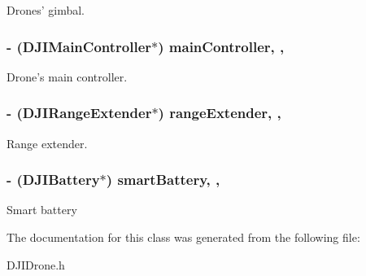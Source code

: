 Drones' gimbal. \hypertarget{interface_d_j_i_drone_a7f05dfcf7d06e7663926954211683eb4}{
\subsubsection[{main\+Controller}]{\setlength{\rightskip}{0pt plus 5cm}-\/ ({\bf D\+J\+I\+Main\+Controller}$\ast$) main\+Controller\hspace{0.3cm}{\ttfamily [read]}, {\ttfamily [nonatomic]}, {\ttfamily [assign]}}}\label{interface_d_j_i_drone_a7f05dfcf7d06e7663926954211683eb4}
Drone's main controller. \hypertarget{interface_d_j_i_drone_aad1a0914357ef128bb16d52f8a7670e4}{
\subsubsection[{range\+Extender}]{\setlength{\rightskip}{0pt plus 5cm}-\/ ({\bf D\+J\+I\+Range\+Extender}$\ast$) range\+Extender\hspace{0.3cm}{\ttfamily [read]}, {\ttfamily [nonatomic]}, {\ttfamily [assign]}}}\label{interface_d_j_i_drone_aad1a0914357ef128bb16d52f8a7670e4}
Range extender. \hypertarget{interface_d_j_i_drone_a762451fe8b64cbbc3c9d288ef29b0f99}{
\subsubsection[{smart\+Battery}]{\setlength{\rightskip}{0pt plus 5cm}-\/ ({\bf D\+J\+I\+Battery}$\ast$) smart\+Battery\hspace{0.3cm}{\ttfamily [read]}, {\ttfamily [nonatomic]}, {\ttfamily [assign]}}}\label{interface_d_j_i_drone_a762451fe8b64cbbc3c9d288ef29b0f99}
Smart battery 

The documentation for this class was generated from the following file\+:\begin{DoxyCompactItemize}
\item 
D\+J\+I\+Drone.\+h\end{DoxyCompactItemize}
